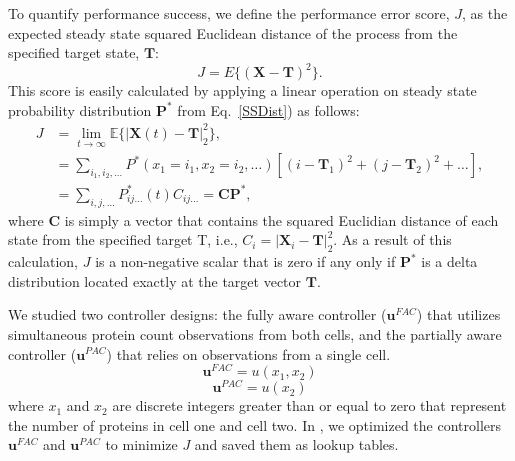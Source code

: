 \documentclass[12pt]{article}
\begin{document}
To quantify performance success, we define the performance error score, $J$, as the expected steady state squared Euclidean distance of the process from the specified target state, $\mathbf{T}$:
 \begin{equation}
 J = E\{(\mathbf{X}-\mathbf{T})^2\}.
 \end{equation}
This score is easily calculated by applying a linear operation on steady state probability distribution $\mathbf{P}^*$ from Eq.\ \ref{SSDist}) as follows:
{ \begin{align}
J&= \lim_{t\rightarrow \infty}\mathbb{E}\{|\mathbf{X}(t)-\mathbf{T}|_2^2\}, \nonumber \\ 
&=\sum_{i_1,i_2,\ldots} P^*(x_1=i_1,x_2=i_2,\ldots) \left[(i-\mathbf T_1)^2 + (j-\mathbf T_2)^2 +\ldots\right],\nonumber  \\
&=\sum_{i,j,\ldots} P^*_{ij\ldots}(t)C_{ij\ldots} =\mathbf{C}\mathbf{P}^*,
\label{Euclid}
\end{align}} where $\mathbf{C}$ is simply a vector that contains the squared Euclidian distance of each state from the specified target T, i.e., $C_i = |\mathbf{X}_i-\mathbf{T}|_2^2$. As a result of this calculation, $J$ is a non-negative scalar that is zero if any only if $\mathbf{P}^*$ is a delta distribution located exactly at the target vector $\mathbf{T}$.


We studied two controller designs: the fully aware controller ($\mathbf{u}^{FAC}$) that utilizes simultaneous protein count observations from both cells, and the partially aware controller ($\mathbf{u}^{PAC}$) that relies on observations from a single cell.
\begin{equation}
\mathbf{u}^{FAC}=u(x_1,x_2)
\end{equation}
\begin{equation}
\mathbf{u}^{PAC}=u(x_2)
\end{equation}
where $x_1$ and $x_2$ are discrete integers greater than or equal to zero that represent the number of proteins in cell one and cell two. In \cite{May2021}, we optimized the controllers $\mathbf{u}^{FAC}$ and $\mathbf{u}^{PAC}$ to minimize $J$ and saved them as lookup tables. 
\end{document}

